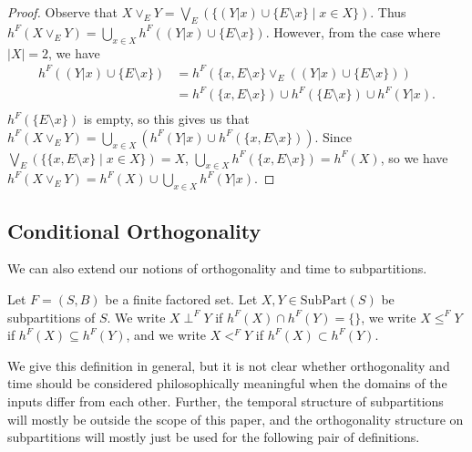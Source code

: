 \documentclass[authordate,onecolumn]{miri-tech-article}
\begin{document}
\begin{proof}
Observe that $X\vee_E Y=\bigvee_E(\{(Y|x)\cup\{E\setminus x\}\mid x\in X\})$. Thus $h^F(X\vee_E Y)=\bigcup_{x\in X}h^F((Y|x)\cup\{E\setminus x\})$. However, from the case where $|X|=2$, we have 
\begin{equation}
\begin{split}
h^F((Y|x)\cup\{E\setminus x\}) & =h^F(\{x,E\setminus x\}\vee_E((Y|x)\cup\{E\setminus x\})) \\
 & =h^F(\{x,E\setminus x\})\cup h^F(\{E\setminus x\})\cup h^F(Y|x).\\
\end{split}
\end{equation}
 $h^F(\{E\setminus x\})$ is empty, so this gives us that $h^F(X\vee_E Y)=\bigcup_{x\in X}(h^F(Y|x)\cup h^F(\{x,E\setminus x\}))$. Since $\bigvee_E(\{\{x,E\setminus x\}\mid x\in X\})=X$, $\bigcup_{x\in X} h^F(\{x,E\setminus x\})=h^F(X)$, so we have $h^F(X\vee_EY)=h^F(X)\cup \bigcup_{x\in X}h^F(Y|x)$.
\end{proof}

\subsection{Conditional Orthogonality}
We can also extend our notions of orthogonality and time to subpartitions.
\begin{definition}
Let $F=(S,B)$ be a finite factored set. Let $X,Y\in \text{SubPart}(S)$ be subpartitions of $S$. We write $X\perp^F Y$ if $h^F(X)\cap h^F(Y)=\{\}$, we write $X\leq^F Y$ if $h^F(X)\subseteq h^F(Y)$, and we write $X<^F Y$ if $h^F(X)\subset h^F(Y)$.
\end{definition}
We give this definition in general, but it is not clear whether orthogonality and time should be considered philosophically meaningful when the domains of the inputs differ from each other. Further, the temporal structure of subpartitions will mostly be outside the scope of this paper, and the orthogonality structure on subpartitions will mostly just be used for the following pair of definitions.
\end{document}
